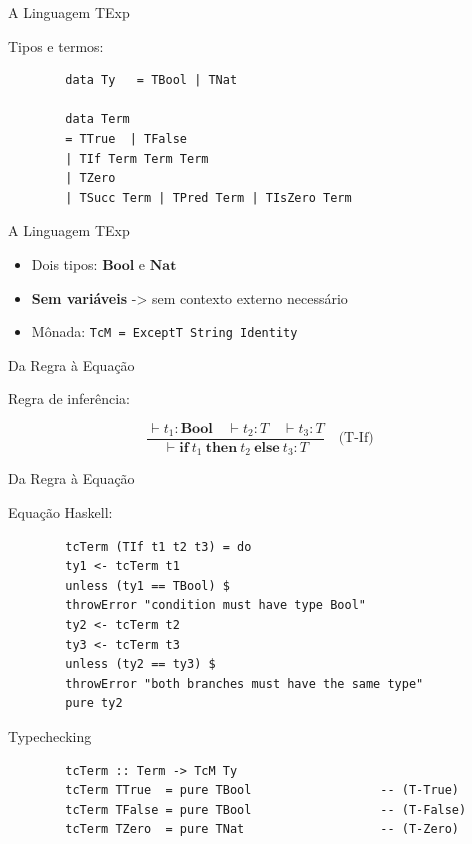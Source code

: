 \begin{frame}[fragile]{A Linguagem TExp}

    Tipos e termos:

    \begin{lstlisting}
        data Ty   = TBool | TNat

        data Term
        = TTrue  | TFalse
        | TIf Term Term Term
        | TZero
        | TSucc Term | TPred Term | TIsZero Term
    \end{lstlisting}
\end{frame}

\begin{frame}[fragile]{A Linguagem TExp}

    \begin{itemize}

        \item
        Dois tipos: \(\mathbf{Bool}\) e \(\mathbf{Nat}\)
        \item
        \textbf{Sem variáveis} -> sem contexto externo necessário
        \item
        Mônada: \texttt{TcM = ExceptT String Identity}
    \end{itemize}
\end{frame}

\begin{frame}{Da Regra à Equação}

    Regra de inferência:

    \[\frac{\vdash t_1 : \mathbf{Bool} \quad \vdash t_2 : T \quad \vdash t_3 : T}{\vdash \mathbf{if}\ t_1\ \mathbf{then}\ t_2\ \mathbf{else}\ t_3 : T} \quad\text{(T-If)}\]
\end{frame}

\begin{frame}[fragile]{Da Regra à Equação}

    Equação Haskell:

    \begin{lstlisting}
        tcTerm (TIf t1 t2 t3) = do
        ty1 <- tcTerm t1
        unless (ty1 == TBool) $
        throwError "condition must have type Bool"
        ty2 <- tcTerm t2
        ty3 <- tcTerm t3
        unless (ty2 == ty3) $
        throwError "both branches must have the same type"
        pure ty2
    \end{lstlisting}
\end{frame}

\begin{frame}[fragile]{Typechecking}

    \begin{lstlisting}
        tcTerm :: Term -> TcM Ty
        tcTerm TTrue  = pure TBool                  -- (T-True)
        tcTerm TFalse = pure TBool                  -- (T-False)
        tcTerm TZero  = pure TNat                   -- (T-Zero)
    \end{lstlisting}
\end{frame}

